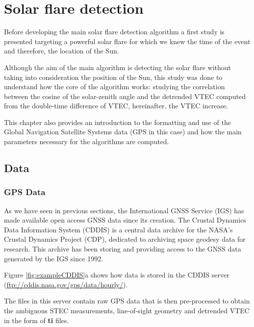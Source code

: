 \chapter{Solar flare detection}\label{solarFlareChapter}

Before developing the main solar flare detection algorithm a first study is presented targeting a powerful solar flare for which we knew the time of the event and therefore, the location of the Sun.

Although the aim of the main algorithm is detecting the solar flare without taking into consideration the position of the Sun, this study was done to understand how the core of the algorithm works: studying the correlation between the cosine of the solar-zenith angle and the detrended VTEC computed from the double-time difference of VTEC, hereinafter, the VTEC increase.

This chapter also provides an introduction to the formatting and use of the Global Navigation Satellite Systems data (GPS in this case) and how the main parameters necessary for the algorithms are computed.

\section{Data}

\subsection{GPS Data}

As we have seen in previous sections, the International GNSS Service (IGS) has made available open access GNSS data since its creation. The Crustal Dynamics Data Information System (CDDIS) is a central data archive for the NASA's Crustal Dynamics Project (CDP), dedicated to archiving space geodesy data for research. This archive has been storing and providing access to the GNSS data generated by the IGS since 1992.

Figure \ref{fig:exampleCDDIS}a shows how data is stored in the CDDIS server (\url{ftp://cddis.nasa.gov/gps/data/hourly/}).

The files in this server contain raw GPS data that is then pre-processed to obtain the ambiguous STEC measurements, line-of-sight
geometry and detrended VTEC in the form of \textbf{ti} files. 




